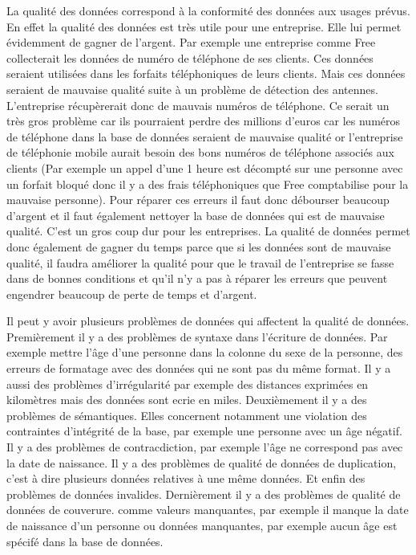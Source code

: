 \documentclass[12pt, a4paper]{article}
\begin{document}
La qualité des données correspond à la conformité des données aux usages prévus. En effet la qualité des données est très utile pour une entreprise. Elle lui permet évidemment de gagner de l'argent. Par exemple une entreprise comme Free collecterait les données de numéro de téléphone de ses clients. Ces données seraient utilisées dans les forfaits téléphoniques de leurs clients. Mais ces données seraient de mauvaise qualité suite à un problème de détection des antennes. L'entreprise récupèrerait donc de mauvais numéros de téléphone. Ce serait un très gros problème car ils pourraient perdre des millions d'euros car les numéros de téléphone dans la base de données seraient de mauvaise qualité or l'entreprise de téléphonie mobile aurait besoin des bons numéros de téléphone associés aux clients (Par exemple un appel d'une 1 heure est décompté sur une personne avec un forfait bloqué donc il y a des frais téléphoniques que Free comptabilise pour la mauvaise personne). Pour réparer ces erreurs il faut donc débourser beaucoup d'argent et il faut également nettoyer la base de données qui est de mauvaise qualité. C'est un gros coup dur pour les entreprises. La qualité de données permet donc également de gagner du temps parce que si les données sont de mauvaise qualité, il faudra améliorer la qualité pour que le travail de l'entreprise se fasse dans de bonnes conditions et qu'il n'y a pas à réparer les erreurs que peuvent engendrer beaucoup de perte de temps et d'argent.

Il peut y avoir plusieurs problèmes de données qui affectent la qualité de données. 
Premièrement il y a des problèmes de syntaxe dans l'écriture de données. Par exemple mettre l'âge d'une personne dans la colonne du sexe de la personne, des erreurs de formatage avec des données qui ne sont pas du même format. Il y a aussi des problèmes d'irrégularité par exemple des distances exprimées en kilomètres mais des données sont ecrie en miles.
Deuxièmement il y a des problèmes de sémantiques.
Elles concernent notamment une violation des contraintes d'intégrité de la base, par exemple une personne avec un âge négatif.
Il y a des problèmes de contracdiction, par exemple l'âge ne correspond pas avec la date de naissance.
Il y a des problèmes de qualité de données de duplication, c'est à dire plusieurs données relatives à une même données.
Et enfin des problèmes de données invalides.
Dernièrement il y a des problèmes de qualité de données de couverure.
comme valeurs manquantes, par exemple il manque la date de naissance d'un personne ou données manquantes, par exemple aucun âge est spécifé dans la base de données.
\end{document}
